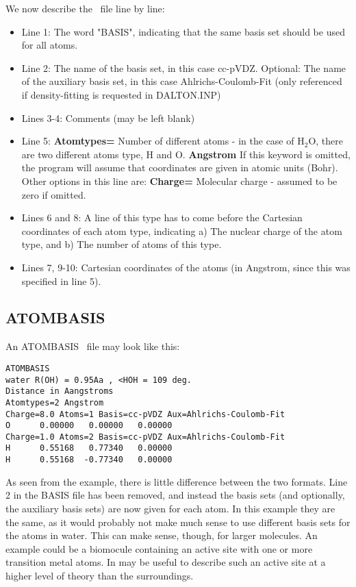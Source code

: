 We now describe the \mol\ file line by line:
\begin{itemize}
\item Line 1: The word "BASIS", indicating that the same basis set should be used for all 
atoms.
\item Line 2: The name of the basis set, in this case cc-pVDZ. Optional: The name
of the auxiliary basis set, in this case Ahlrichs-Coulomb-Fit
(only referenced if density-fitting is requested in DALTON.INP)
\item Lines 3-4: Comments (may be left blank)
\item Line 5: {\bf Atomtypes=} Number of different atoms - in the case of H$_2$O, there are two different
atoms type, H and O. {\bf Angstrom} If this keyword is omitted, the program will assume that coordinates
are given in atomic units (Bohr). Other options in this line are:
{\bf Charge=} Molecular charge - assumed to be zero if omitted. 
\item Lines 6 and 8: A line of this type has to come before the Cartesian coordinates of each atom
type, indicating a) The nuclear charge of the atom type, and b) The number of atoms of this type.
\item Lines 7, 9-10: Cartesian coordinates of the atoms (in Angstrom, since this was specified 
in line 5).
\end{itemize}

\subsection{ATOMBASIS}

An ATOMBASIS \mol\ file may look like this:
\begin{verbatim}
ATOMBASIS
water R(OH) = 0.95Aa , <HOH = 109 deg.
Distance in Aangstroms
Atomtypes=2 Angstrom
Charge=8.0 Atoms=1 Basis=cc-pVDZ Aux=Ahlrichs-Coulomb-Fit
O      0.00000   0.00000   0.00000
Charge=1.0 Atoms=2 Basis=cc-pVDZ Aux=Ahlrichs-Coulomb-Fit
H      0.55168   0.77340   0.00000
H      0.55168  -0.77340   0.00000
\end{verbatim}
As seen from the example, there is little difference between the two
formats. Line 2 in the BASIS file has been removed, and instead the basis
sets (and optionally, the auxiliary basis sets) are now given for each
atom. In this example they are the same, as it would probably not make
much sense to use different basis sets for the atoms in water. This can
make sense, though, for larger molecules. An example could be a biomocule containing
an active site with one or more transition metal atoms. In may be useful to
describe such an active site at a higher level of theory than the surroundings. 

